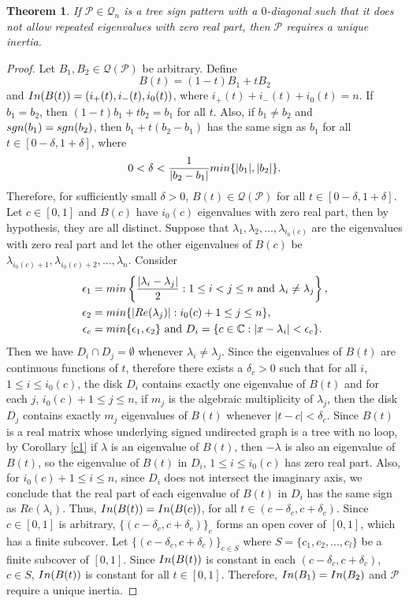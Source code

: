 \documentclass[10pt,a4paper]{amsart}
\newtheorem{theorem}{Theorem}[section]
\numberwithin{equation}{section}
\def\sgn{{\rm sgn}}
\def\In{{\rm In}}
\def\min{{\rm min}}
\begin{document}
	\begin{theorem} \label{l3.3ne}
		If $\mathcal{P}\in \mathcal{Q}_n$ is a tree sign pattern with a $0$-diagonal such that it does not allow repeated eigenvalues with zero real part, then $\mathcal{P}$ requires a unique inertia.
	\end{theorem}
	\begin{proof}
		Let $B_1,B_2\in \mathcal{Q}(\mathcal{P})$ be arbitrary. Define $$B(t)=(1-t)B_1+tB_2$$ and $\In(B(t))=(i_+(t),i_-(t),i_0(t))$, where $i_+(t)+i_-(t)+i_0(t)=n$. If $b_1=b_2$, then $(1-t)b_1+tb_2=b_1$ for all $t$. Also, if $b_1 \neq b_2$ and $\sgn(b_1)=\sgn(b_2)$, then $b_1+t(b_2-b_1)$ has the same sign as $b_1$ for all $t\in [0-\delta, 1+\delta]$, where $$0<\delta<\frac{1}{|b_2-b_1|}\min\{|b_1|,|b_2|\}.$$ Therefore, for sufficiently small $\delta>0$, $B(t)\in \mathcal{Q}(\mathcal{P})$ for all $t\in [0-\delta,1+\delta]$. Let $c\in [0,1]$ and $B(c)$ have $i_0(c)$ eigenvalues with zero real part, then by hypothesis, they are all distinct. Suppose that $\lambda_1, \lambda_2,...,\lambda_{i_0(c)}$ are the eigenvalues with zero real part and let the other eigenvalues of $B(c)$ be $\lambda_{i_0(c)+1}, \lambda_{i_0(c)+2},...,\lambda_n$. Consider 
		\begin{align*}
			\epsilon_1&=\min\left\{ \frac{|\lambda_i-\lambda_j|}{2}: 1\leq i<j\leq n~ \text{and} ~ \lambda_i\neq \lambda_j\right\},\\ \epsilon_2&=\min\{|Re(\lambda_j)|: i_0(c)+1\leq j\leq n\},\\ \epsilon_c&=\min\{\epsilon_1,\epsilon_2\}~ \text{and} ~ D_i=\{c\in \mathbb{C}: |x-\lambda_i|<\epsilon_c\}.
		\end{align*}
		Then we have $D_i\cap D_j=\emptyset$ whenever $\lambda_i\neq \lambda_j$. Since the eigenvalues of $B(t)$ are continuous functions of $t$, therefore there exists a $\delta_c>0$ such that for all $i$, $1\leq i\leq i_0(c)$, the disk $D_i$ contains exactly one eigenvalue of $B(t)$ and for each $j$, $i_0(c)+1\leq j\leq n$, if $m_j$ is the algebraic multiplicity of $\lambda_j$, then the disk $D_j$ contains exactly $m_j$ eigenvalues of $B(t)$ whenever $|t-c|<\delta_c$. Since $B(t)$ is a real matrix whose underlying signed undirected graph is a tree with no loop, by Corollary \ref{c1} if $\lambda$ is an eigenvalue of $B(t)$, then $-\lambda$ is also an eigenvalue of $B(t)$, so the eigenvalue of $B(t)$ in $D_i$, $1\leq i\leq i_0(c)$ has zero real part.
		Also, for $i_0(c)+1\leq i\leq n$, since $D_i$ does not intersect the imaginary axis, we conclude that the real part of each eigenvalue of $B(t)$ in $D_i$ has the same sign as $Re(\lambda_i)$. Thus, $\In(B(t))=\In(B(c))$, for all $t\in(c-\delta_c,c+\delta_c)$. Since $c\in [0,1]$ is arbitrary, $\{(c-\delta_c,c+\delta_c)\}_c$ forms an open cover of $[0,1]$, which has a finite subcover. Let $\{(c-\delta_c,c+\delta_c)\}_{c\in S}$ where $S=\{c_1,c_2,...,c_l\}$ be a finite subcover of $[0,1]$. Since $\In(B(t))$ is constant in each $(c-\delta_c,c+\delta_c)$, $c\in S$, $\In(B(t))$ is constant for all $t\in [0,1]$. Therefore, $\In(B_1)=\In(B_2)$ and $\mathcal{P}$ require a unique inertia.
	\end{proof}
\end{document}
